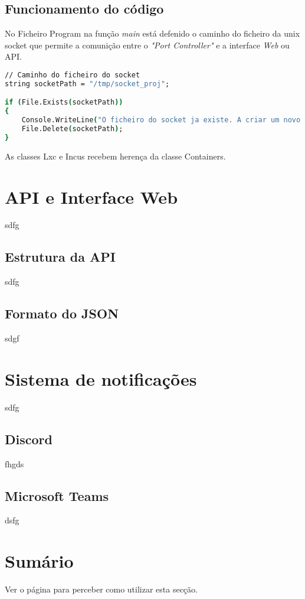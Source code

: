 \subsection{Funcionamento do código}


No Ficheiro Program na função \textit{main} está defenido o caminho do ficheiro 
da unix socket que permite a comunição entre o \textit{"Port Controller"} e 
a interface \textit{Web} ou API.


\begin{lstlisting}[language=csh, caption={teste}]
// Caminho do ficheiro do socket
string socketPath = "/tmp/socket_proj";

if (File.Exists(socketPath))
{
    Console.WriteLine("O ficheiro do socket ja existe. A criar um novo...");
    File.Delete(socketPath);
}

\end{lstlisting}




As classes Lxc e Incus recebem herença da classe Containers.


\section{API e Interface Web}

sdfg

\subsection{Estrutura da API}

sdfg

\subsection{Formato do JSON}

sdgf

\section{Sistema de notificações}

sdfg

\subsection{Discord}

fhgds

\subsection{Microsoft Teams}

dsfg

\section*{Sumário}

Ver o  página \pageref{sec:intro_summary} para perceber como utilizar esta secção.


